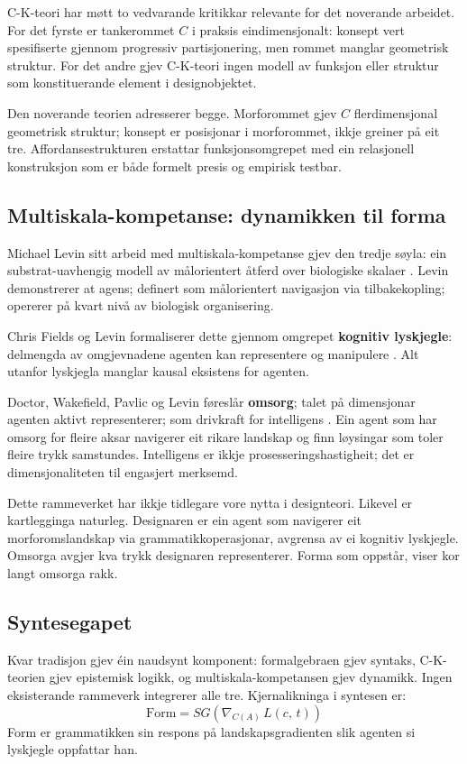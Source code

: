 C-K-teori har møtt to vedvarande kritikkar relevante for det noverande arbeidet. For det fyrste er tankerommet $C$ i praksis eindimensjonalt: konsept vert spesifiserte gjennom progressiv partisjonering, men rommet manglar geometrisk struktur. For det andre gjev C-K-teori ingen modell av funksjon eller struktur som konstituerande element i designobjektet.

Den noverande teorien adresserer begge. Morforommet gjev $C$ flerdimensjonal geometrisk struktur; konsept er posisjonar i morforommet, ikkje greiner på eit tre. Affordansestrukturen erstattar funksjonsomgrepet med ein relasjonell konstruksjon som er både formelt presis og empirisk testbar.

\subsection{Multiskala-kompetanse: dynamikken til forma}

Michael Levin sitt arbeid med multiskala-kompetanse gjev den tredje søyla: ein substrat-uavhengig modell av målorientert åtferd over biologiske skalaer \parencite{Levin2022}. Levin demonstrerer at agens; definert som målorientert navigasjon via tilbakekopling; opererer på kvart nivå av biologisk organisering.

Chris Fields og Levin formaliserer dette gjennom omgrepet \textbf{kognitiv lyskjegle}: delmengda av omgjevnadene agenten kan representere og manipulere \parencite{Fields2022}. Alt utanfor lyskjegla manglar kausal eksistens for agenten.

Doctor, Wakefield, Pavlic og Levin føreslår \textbf{omsorg}; talet på dimensjonar agenten aktivt representerer; som drivkraft for intelligens \parencite{Doctor2024}. Ein agent som har omsorg for fleire aksar navigerer eit rikare landskap og finn løysingar som toler fleire trykk samstundes. Intelligens er ikkje prosesseringshastigheit; det er dimensjonaliteten til engasjert merksemd.

Dette rammeverket har ikkje tidlegare vore nytta i designteori. Likevel er kartlegginga naturleg. Designaren er ein agent som navigerer eit morforomslandskap via grammatikkoperasjonar, avgrensa av ei kognitiv lyskjegle. Omsorga avgjer kva trykk designaren representerer. Forma som oppstår, viser kor langt omsorga rakk.

\subsection{Syntesegapet}

Kvar tradisjon gjev éin naudsynt komponent: formalgebraen gjev syntaks, C-K-teorien gjev epistemisk logikk, og multiskala-kompetansen gjev dynamikk. Ingen eksisterande rammeverk integrerer alle tre. Kjernalikninga i syntesen er:
\begin{equation*}
\mathrm{Form} = SG\!\left(\nabla_{C(A)}\, L(c,\, t)\right)
\end{equation*}
\noindent Form er grammatikken sin respons på landskapsgradienten slik agenten si lyskjegle oppfattar han.
